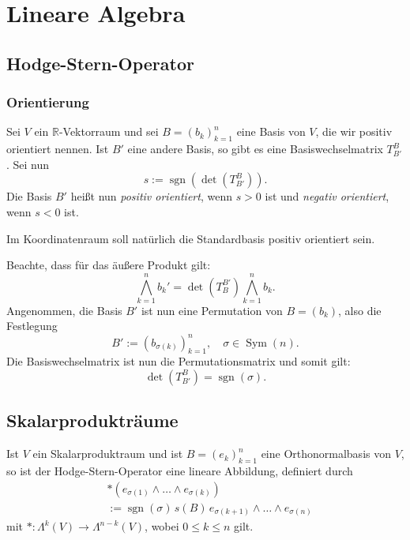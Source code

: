 \documentclass[a4paper,10pt,fleqn,twocolumn,twoside]{article}
\numberwithin{equation}{section}
\newcommand{\sgn}{\operatorname{sgn}}
\newcommand{\R}{\mathbb R}
\begin{document}
\newpage
\section{Lineare Algebra}
\subsection{Hodge-Stern-Operator}
\subsubsection{Orientierung}
Sei $V$ ein $\R$-Vektorraum und sei $B=(b_k)_{k=1}^n$ eine Basis
von $V$, die wir positiv orientiert nennen. Ist $B'$ eine andere
Basis, so gibt es eine Basiswechselmatrix $T_{B'}^B$. Sei nun
\begin{equation}
s := \sgn(\det(T_{B'}^B)).
\end{equation}
Die Basis $B'$ heißt nun \emph{positiv orientiert}, wenn
$s>0$ ist und \emph{negativ orientiert}, wenn $s<0$ ist.

Im Koordinatenraum soll natürlich die Standardbasis positiv
orientiert sein.

Beachte, dass für das äußere Produkt gilt:
\begin{equation}
\bigwedge_{k=1}^n b_k' = \det(T_B^{B'}) \bigwedge_{k=1}^n b_k.
\end{equation}
Angenommen, die Basis $B'$ ist nun eine Permutation von $B=(b_k)$,
also die Festlegung
\begin{equation}
B' := (b_{\sigma(k)})_{k=1}^n, \quad \sigma\in\operatorname{Sym}(n).
\end{equation}
Die Basiswechselmatrix ist nun die Permutationsmatrix und somit gilt:
\begin{equation}
\det(T_{B'}^B) = \sgn(\sigma).
\end{equation}

\subsection{Skalarprodukträume}
Ist $V$ ein Skalarproduktraum und ist
$B=(e_k)_{k=1}^n$ eine Orthonormalbasis von $V$,
so ist der Hodge-Stern-Operator eine lineare Abbildung,
definiert durch%
\begin{equation}
\begin{split}
&*(e_{\sigma(1)}\wedge\ldots\wedge e_{\sigma(k)})\\
&:= \sgn(\sigma)\,s(B)\,e_{\sigma(k+1)}\wedge\ldots\wedge e_{\sigma(n)}
\end{split}
\end{equation}
mit $*\colon \Lambda^k(V)\to\Lambda^{n-k}(V)$,
wobei $0\le k\le n$ gilt.
\end{document}
